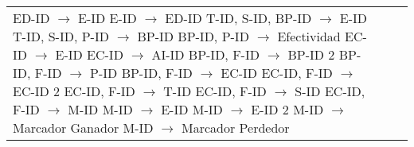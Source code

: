 \documentclass{report}
\begin{document}
\begin{tabularx}{\textwidth}{|X|X|X|}
        ED-ID $\rightarrow$ E-ID \newline 
        E-ID $\rightarrow$ ED-ID \newline 
        T-ID, S-ID, BP-ID $\rightarrow$ E-ID \newline 
        T-ID, S-ID, P-ID $\rightarrow$ BP-ID \newline 
        BP-ID, P-ID $\rightarrow$ Efectividad \newline 
        EC-ID $\rightarrow$ E-ID \newline 
        EC-ID $\rightarrow$ AI-ID \newline 
        BP-ID, F-ID $\rightarrow$ BP-ID 2 \newline 
        BP-ID, F-ID $\rightarrow$ P-ID \newline 
        BP-ID, F-ID $\rightarrow$ EC-ID \newline 
        EC-ID, F-ID $\rightarrow$ EC-ID 2 \newline 
        EC-ID, F-ID $\rightarrow$ T-ID \newline 
        EC-ID, F-ID $\rightarrow$ S-ID \newline 
        EC-ID, F-ID $\rightarrow$ M-ID \newline 
        M-ID $\rightarrow$ E-ID \newline 
        M-ID $\rightarrow$ E-ID 2 \newline 
        M-ID $\rightarrow$ Marcador Ganador \newline 
        M-ID $\rightarrow$ Marcador Perdedor & 


\end{tabularx}
\end{document}
